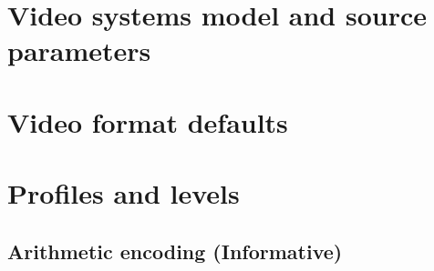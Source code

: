 \clearpage
\section{Video systems model and source parameters}


\clearpage
\section{Video format defaults}

\clearpage
\section{Profiles and levels}

\clearpage
\begin{informative*}
\section{Arithmetic encoding (Informative)}
\end{informative*}

